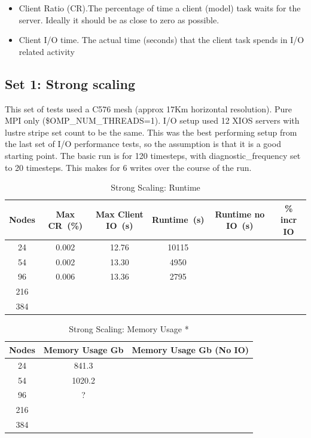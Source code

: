  
\begin{itemize}
  \item Client Ratio (CR).The percentage of time a client (model) task waits for the server. Ideally it should be as close to zero as possible.
  \item Client I/O time. The actual time (seconds) that the client task spends in I/O related activity
\end{itemize} 



\subsection{Set 1: Strong scaling}

This set of tests used a C576 mesh (approx 17Km horizontal resolution). Pure MPI only (\$OMP\_NUM\_THREADS=1). 
I/O setup used 12 XIOS servers with lustre stripe set count to be the same. This was the best performing setup from
the last set of I/O performance tests, so the assumption is that it is a good starting point.
The basic run is for 120 timesteps, with diagnostic\_frequency set to 20 timesteps. This makes for 6 writes over the course of the run.

\begin{table}[ht!]
\scriptsize
  \begin{center}
    \caption{Strong Scaling: Runtime}
    \label{tab:table1}
     \begin{tabular}{|c|c|c|c|c|c|}
      \textbf{Nodes} & \textbf{Max CR~(\%)} & \textbf{Max Client IO~(s)} & \textbf{Runtime~(s)} & \textbf{Runtime no IO~(s)} & \textbf{\% incr IO}\\
      \hline
      24 & 0.002 & 12.76 & 10115 & & \\
      54 & 0.002 & 13.30 & 4950 & & \\
      96 & 0.006 & 13.36 & 2795 & & \\
      216 & & & & & \\
      384 & & & & & \\
    \end{tabular}
  \end{center}
\end{table}

\begin{table}[ht!]
\scriptsize
  \begin{center}
    \caption{Strong Scaling: Memory Usage *}
    \label{tab:table2}
     \begin{tabular}{|c|c|c|}
      \textbf{Nodes} & \textbf{Memory Usage Gb} & \textbf{Memory Usage Gb (No IO)} \\
      \hline
      24 & 841.3 &  \\
      54 & 1020.2  &  \\
      96 & ? &  \\
      216 & & \\
      384 & & \\
    \end{tabular}
  \end{center}
\end{table}

